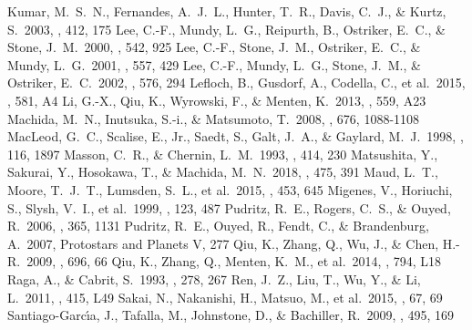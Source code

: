 \documentclass[twocolumn]{aastex62}
\begin{document}
\begin{thebibliography}{}
 Kumar, M.~S.~N., Fernandes, A.~J.~L., Hunter, T.~R., Davis, C.~J., \& Kurtz, S.\ 2003, \aap, 412, 175 
 Lee, C.-F., Mundy, L.~G., Reipurth, B., Ostriker, E.~C., \& Stone, J.~M.\ 2000, \apj, 542, 925
 Lee, C.-F., Stone, J.~M., Ostriker, E.~C., \& Mundy, L.~G.\ 2001, \apj, 557, 429 
 Lee, C.-F., Mundy, L.~G., Stone, J.~M., \& Ostriker, E.~C.\ 2002, \apj, 576, 294 
 Lefloch, B., Gusdorf, A., Codella, C., et al.\ 2015, \aap, 581, A4
 Li, G.-X., Qiu, K., Wyrowski, F., \& Menten, K.\ 2013, \aap, 559, A23 
 Machida, M.~N., Inutsuka, S.-i., \& Matsumoto, T.\ 2008, \apj, 676, 1088-1108  
 MacLeod, G.~C., Scalise, E., Jr., Saedt, S., Galt, J.~A., \& Gaylard, M.~J.\ 1998, \aj, 116, 1897 
 Masson, C.~R., \& Chernin, L.~M.\ 1993, \apj, 414, 230 
 Matsushita, Y., Sakurai, Y., Hosokawa, T., \& Machida, M.~N.\ 2018, \mnras, 475, 391 
 Maud, L.~T., Moore, T.~J.~T., Lumsden, S.~L., et al.\ 2015, \mnras, 453, 645
 Migenes, V., Horiuchi, S., Slysh, V.~I., et al.\ 1999, \apjs, 123, 487
 Pudritz, R.~E., Rogers, C.~S., \& Ouyed, R.\ 2006, \mnras, 365, 1131 
 Pudritz, R.~E., Ouyed, R., Fendt, C., \& Brandenburg, A.\ 2007, Protostars and Planets V, 277
 Qiu, K., Zhang, Q., Wu, J., \& Chen, H.-R.\ 2009, \apj, 696, 66
 Qiu, K., Zhang, Q., Menten, K.~M., et al.\ 2014, \apjl, 794, L18 
 Raga, A., \& Cabrit, S.\ 1993, \aap, 278, 267 
 Ren, J.~Z., Liu, T., Wu, Y., \& Li, L.\ 2011, \mnras, 415, L49 
 Sakai, N., Nakanishi, H., Matsuo, M., et al.\ 2015, \pasj, 67, 69
 Santiago-Garc{\'{\i}}a, J., Tafalla, M., Johnstone, D., \& Bachiller, R.\ 2009, \aap, 495, 169

\end{thebibliography}
\end{document}
